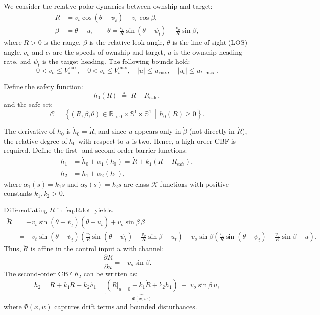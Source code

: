 \documentclass[11pt,a4paper]{article}
\numberwithin{equation}{section}
\begin{document}
We consider the relative polar dynamics between ownship and target:
\begin{align}
    \dot R &= v_t \cos(\theta - \psi_t) - v_o \cos\beta, \label{eq:Rdot}\\
    \dot\beta &= \dot\theta - u, \qquad
    \dot\theta = \frac{v_t}{R}\sin(\theta - \psi_t) - \frac{v_o}{R}\sin\beta, \label{eq:betadot}
\end{align}
where $R > 0$ is the range, $\beta$ is the relative look angle, $\theta$ is the line-of-sight (LOS) angle, $v_o$ and $v_t$ are the speeds of ownship and target, $u$ is the ownship heading rate, and $\psi_t$ is the target heading. The following bounds hold:
\[
0 < v_o \le V_o^{\max}, \quad 0 < v_t \le V_t^{\max}, \quad 
|u| \le u_{\max}, \quad |u_t| \le u_{t,\max}.
\]

Define the safety function:
\[
h_0(R) \;\triangleq\; R - R_{\mathrm{safe}}, 
\]
and the safe set:
\[
\mathcal{C} 
= 
\left\{ (R, \beta, \theta) \in \mathbb{R}_{>0} \times \mathbb{S}^1 \times \mathbb{S}^1
\,\middle|\,
h_0(R) \ge 0
\right\}.
\]

The derivative of $h_0$ is $\dot h_0 = \dot R$, and since $u$ appears only in $\dot\beta$ (not directly in $\dot R$), the relative degree of $h_0$ with respect to $u$ is two. Hence, a high-order CBF is required. Define the first- and second-order barrier functions:
\begin{align}
    h_1 &= \dot h_0 + \alpha_1(h_0) = \dot R + k_1 (R - R_{\mathrm{safe}}), \label{eq:h1}\\
    h_2 &= \dot h_1 + \alpha_2(h_1), \label{eq:h2}
\end{align}
where $\alpha_1(s) = k_1 s$ and $\alpha_2(s) = k_2 s$ are class-$\mathcal{K}$ functions with positive constants $k_1, k_2 > 0$.

Differentiating $\dot R$ in \eqref{eq:Rdot} yields:
\begin{align}
    \ddot R
    &= -v_t \sin(\theta - \psi_t) \left( \dot\theta - u_t \right)
       + v_o \sin\beta \, \dot\beta \nonumber\\
    &= -v_t \sin(\theta - \psi_t) \left( \tfrac{v_t}{R} \sin(\theta - \psi_t) - \tfrac{v_o}{R} \sin\beta - u_t \right)
       + v_o \sin\beta \left( \tfrac{v_t}{R} \sin(\theta - \psi_t) - \tfrac{v_o}{R} \sin\beta - u \right). 
    \label{eq:Rddot}
\end{align}
Thus, $\ddot R$ is affine in the control input $u$ with channel:
\begin{equation}
    \frac{\partial \ddot R}{\partial u} = - v_o \sin\beta.
    \label{eq:input_channel}
\end{equation}
The second-order CBF $h_2$ can be written as:
\begin{equation}
    h_2 = \ddot R + k_1 \dot R + k_2 h_1
        = 
        \underbrace{
            \left( \ddot R|_{u=0} + k_1 \dot R + k_2 h_1 \right)
        }_{\Phi(x,w)}
        \;-\; v_o \sin\beta \, u,
    \label{eq:h2_affine}
\end{equation}
where $\Phi(x,w)$ captures drift terms and bounded disturbances.
\end{document}
